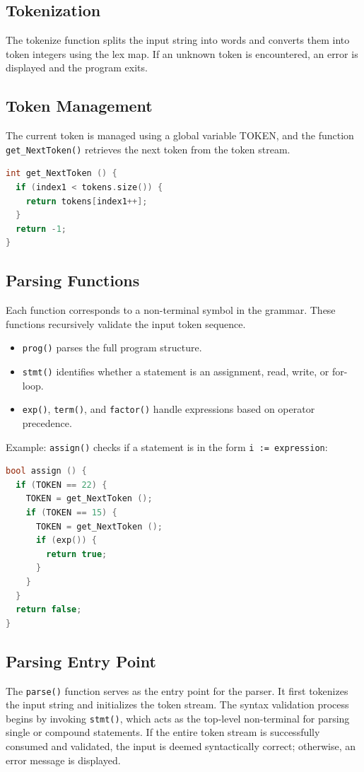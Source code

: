 \documentclass[12pt]{article}
\begin{document}
\subsection{Tokenization}
The tokenize function splits the input string into words and converts them into token integers using the lex map. If an unknown token is encountered, an error is displayed and the program exits.

\subsection{Token Management}
The current token is managed using a global variable TOKEN, and the function \texttt{get\_NextToken()} retrieves the next token from the token stream.

\begin{lstlisting}[language=C++]
int get_NextToken () {
  if (index1 < tokens.size()) {
    return tokens[index1++];
  }
  return -1;
}
\end{lstlisting}

\subsection{Parsing Functions}
Each function corresponds to a non-terminal symbol in the grammar. These functions recursively validate the input token sequence.

\begin{itemize}
  \item \texttt{prog()} parses the full program structure.
  \item \texttt{stmt()} identifies whether a statement is an assignment, read, write, or for-loop.
  \item \texttt{exp()}, \texttt{term()}, and \texttt{factor()} handle expressions based on operator precedence.
\end{itemize}

Example: \texttt{assign()} checks if a statement is in the form \texttt{i := expression}:

\begin{lstlisting}[language=C++]
bool assign () {
  if (TOKEN == 22) {
    TOKEN = get_NextToken ();
    if (TOKEN == 15) {
      TOKEN = get_NextToken ();
      if (exp()) {
        return true;
      }
    }
  }
  return false;
}
\end{lstlisting}

\subsection{Parsing Entry Point}
The \texttt{parse()} function serves as the entry point for the parser. It first tokenizes the input string and initializes the token stream. The syntax validation process begins by invoking \texttt{stmt()}, which acts as the top-level non-terminal for parsing single or compound statements. If the entire token stream is successfully consumed and validated, the input is deemed syntactically correct; otherwise, an error message is displayed.
\end{document}
